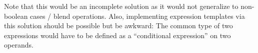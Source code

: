 Note that this would be an incomplete solution as it would not generalize to non-boolean cases / blend operations.
Also, implementing expression templates via this solution should be possible but be awkward:
The common type of two expressions would have to be defined as a “conditional expression” on two operands.

%
%
%

